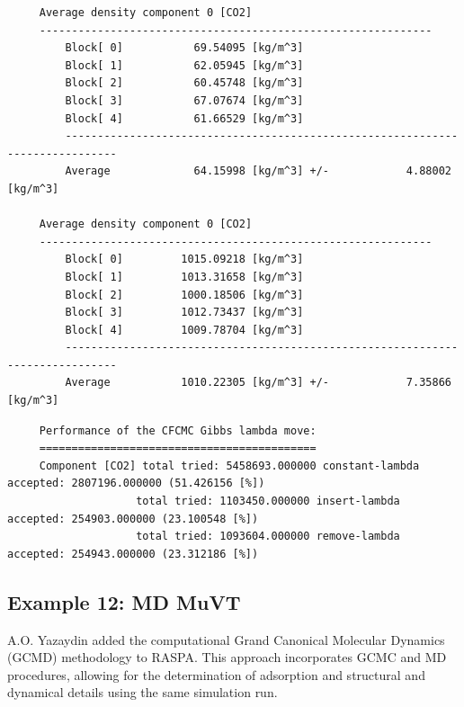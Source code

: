 \begin{tiny}
\begin{verbatim}
     Average density component 0 [CO2]
     -------------------------------------------------------------
         Block[ 0]           69.54095 [kg/m^3]
         Block[ 1]           62.05945 [kg/m^3]
         Block[ 2]           60.45748 [kg/m^3]
         Block[ 3]           67.07674 [kg/m^3]
         Block[ 4]           61.66529 [kg/m^3]
         ------------------------------------------------------------------------------
         Average             64.15998 [kg/m^3] +/-            4.88002 [kg/m^3]
     
     Average density component 0 [CO2]
     -------------------------------------------------------------
         Block[ 0]         1015.09218 [kg/m^3]
         Block[ 1]         1013.31658 [kg/m^3]
         Block[ 2]         1000.18506 [kg/m^3]
         Block[ 3]         1012.73437 [kg/m^3]
         Block[ 4]         1009.78704 [kg/m^3]
         ------------------------------------------------------------------------------
         Average           1010.22305 [kg/m^3] +/-            7.35866 [kg/m^3]
\end{verbatim}
\end{tiny}

\begin{tiny}
\begin{verbatim}
     Performance of the CFCMC Gibbs lambda move:
     ===========================================
     Component [CO2] total tried: 5458693.000000 constant-lambda accepted: 2807196.000000 (51.426156 [%])
                    total tried: 1103450.000000 insert-lambda accepted: 254903.000000 (23.100548 [%])
                    total tried: 1093604.000000 remove-lambda accepted: 254943.000000 (23.312186 [%])
\end{verbatim}
\end{tiny}

\subsection*{Example 12: MD MuVT}

A.O. Yazaydin added the computational Grand Canonical Molecular Dynamics (GCMD) methodology to RASPA\cite{Loganathan2017,Loganathan2018}.
This approach incorporates GCMC and MD procedures, allowing for the determination of adsorption and structural and 
dynamical details using the same simulation run.


